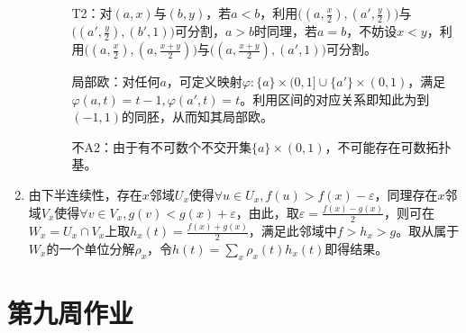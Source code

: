 \documentclass[a4paper,UTF8,fontset=windows]{ctexart}
\begin{document}
\begin{enumerate}[(1)]
\begin{enumerate}[(a)]
\begin{enumerate}[(i)]
    T2：对$(a,x)$与$(b,y)$，若$a<b$，利用$\big((a,\frac{x}{2}),(a',\frac{y}{2})\big)$与$\big((a',\frac{y}{2}),(b',1)\big)$可分割，$a>b$时同理，若$a=b$，不妨设$x<y$，利用$\big((a,\frac{x}{2}),(a,\frac{x+y}{2})\big)$与$\big((a,\frac{x+y}{2}),(a',1)\big)$可分割。
    
    局部欧：对任何$a$，可定义映射$\varphi:\{a\}\times(0,1]\cup\{a'\}\times(0,1)$，满足$\varphi(a,t)=t-1,\varphi(a',t)=t$。利用区间的对应关系即知此为到$(-1,1)$的同胚，从而知其局部欧。
    
    不A2：由于有不可数个不交开集$\{a\}\times(0,1)$，不可能存在可数拓扑基。
    \end{enumerate}
    \end{enumerate}
    
    \item
    由下半连续性，存在$x$邻域$U_x$使得$\forall u\in U_x,f(u)>f(x)-\varepsilon$，同理存在$x$邻域$V_x$使得$\forall v\in V_x,g(v)<g(x)+\varepsilon$，由此，取$\varepsilon=\frac{f(x)-g(x)}{2}$，则可在$W_x=U_x\cap V_x$上取$h_x(t)=\frac{f(x)+g(x)}{2}$，满足此邻域中$f>h_x>g$。取从属于$W_x$的一个单位分解$\rho_x$，令$h(t)=\sum_x\rho_x(t)h_x(t)$即得结果。
\end{enumerate}

\section{第九周作业}
\end{document}
